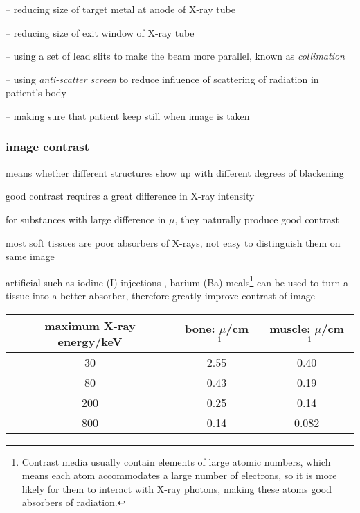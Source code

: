 \begin{compactitem}
	\item[--] reducing size of target metal at anode of X-ray tube
	
	\item[--] reducing size of exit window of X-ray tube
	
	\item[--] using a set of lead slits to make the beam more parallel, known as \emph{collimation}
	
	\item[--] using \emph{anti-scatter screen} to reduce influence of scattering of radiation in patient's body
	
	\item[--] making sure that patient keep still when image is taken
\end{compactitem}


\subsubsection*{image contrast}

 means whether different structures show up with different degrees of blackening

good contrast requires a great difference in X-ray intensity

\cmt for substances with large difference in $\mu$, they naturally produce good contrast

\cmt most soft tissues are poor absorbers of X-rays, not easy to distinguish them on same image

artificial  such as iodine (I) injections , barium (Ba) meals\footnote{Contrast media usually contain elements of large atomic numbers, which means each atom accommodates a large number of electrons, so it is more likely for them to interact with X-ray photons, making these atoms good absorbers of radiation.} can be used to turn a tissue into a better absorber, therefore greatly improve contrast of image




\newpage


\begin{table}[ht]
	\begin{center}
		\begin{tabular}{|c|c|c|}
			\hline
			maximum X-ray energy/keV & bone: $\mu$/cm$^{-1}$ & muscle: $\mu$/cm$^{-1}$ \\ \hline
			30 & 2.55 & 0.40 \\ \hline
			80 & 0.43 & 0.19 \\ \hline
			200 & 0.25 & 0.14 \\ \hline
			800 & 0.14 & 0.082 \\ \hline
		\end{tabular}
	\end{center}
\end{table}




